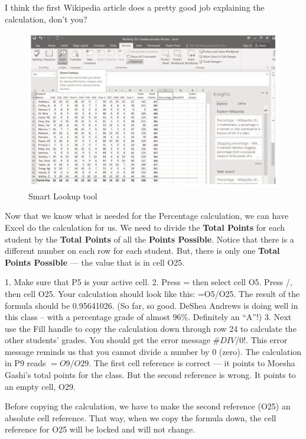 I think the first Wikipedia article does a pretty good job explaining the calculation, don't you?

\begin{figure}[H]
	\centering
	\includegraphics[width=\maxwidth{.95\linewidth}]{gfx/ch03_fig06}
	\caption{Smart Lookup tool}
	\label{03:fig06}
\end{figure}

Now that we know what is needed for the Percentage calculation, we can have Excel do the calculation for us. We need to divide the \textbf{Total Points} for each student by the \textbf{Total Points} of all the \textbf{Points Possible}. Notice that there is a different number on each row for each student. But, there is only one \textbf{Total Points Possible} --- the value that is in cell \textsf{O25}.

1. Make sure that P5 is your active cell.
2. Press = then select cell O5. Press /, then cell O25. Your calculation should look like this: =O5/O25. The result of the formula should be 0.95641026. (So far, so good. DeShea Andrews is doing well in this class – with a percentage grade of almost 96\%. Definitely an ``A''!)
3. Next use the Fill handle to copy the calculation down through row 24 to calculate the other students' grades. You should get the error message $ \#DIV/0! $. This error message reminds us that you cannot divide a number by $ 0 $ (zero). The calculation in \textsf{P9} reads $ =O9/O29 $. The first cell reference is correct --- it points to Moesha Gashi's total points for the class. But the second reference is wrong. It points to an empty cell, \textsf{O29}.

Before copying the calculation, we have to make the second reference (\textsf{O25}) an absolute cell reference. That way, when we copy the formula down, the cell reference for \textsf{O25} will be locked and will not change.

